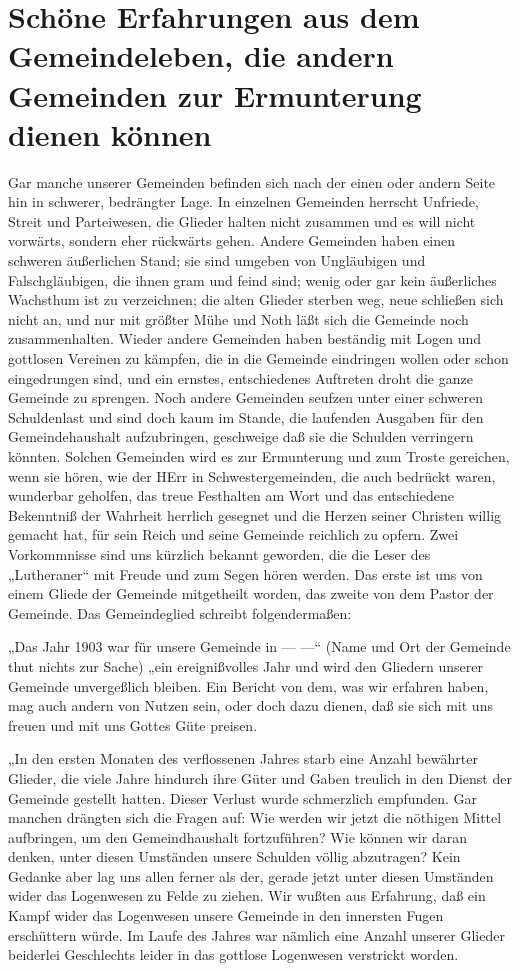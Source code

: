 \chapter[Schöne Erfahrungen aus dem Gemeindeleben]{Schöne Erfahrungen aus dem Gemeindeleben, die andern Gemeinden zur Ermunterung dienen können}

Gar manche unserer Gemeinden befinden sich nach der einen oder andern Seite hin in schwerer, bedrängter Lage. In einzelnen Gemeinden herrscht Unfriede, Streit und Parteiwesen, die Glieder halten nicht zusammen und es will nicht vorwärts, sondern eher rückwärts gehen. Andere Gemeinden haben einen schweren äußerlichen Stand; sie sind umgeben von Ungläubigen und Falschgläubigen, die ihnen gram und feind sind; wenig oder gar kein äußerliches Wachsthum ist zu verzeichnen; die alten Glieder sterben weg, neue schließen sich nicht an, und nur mit größter Mühe und Noth läßt sich die Gemeinde noch zusammenhalten. Wieder andere Gemeinden haben beständig mit Logen und gottlosen Vereinen zu kämpfen, die in die Gemeinde eindringen wollen oder schon eingedrungen sind, und ein ernstes, entschiedenes Auftreten droht die ganze Gemeinde zu sprengen. Noch andere Gemeinden seufzen unter einer schweren Schuldenlast und sind doch kaum im Stande, die laufenden Ausgaben für den Gemeindehaushalt aufzubringen, geschweige daß sie die Schulden verringern könnten. Solchen Gemeinden wird es zur Ermunterung und zum Troste gereichen, wenn sie hören, wie der HErr in Schwestergemeinden, die auch bedrückt waren, wunderbar geholfen, das treue Festhalten am Wort und das entschiedene Bekenntniß der Wahrheit herrlich gesegnet und die Herzen seiner Christen willig gemacht hat, für sein Reich und seine Gemeinde reichlich zu opfern. Zwei Vorkommnisse sind uns kürzlich bekannt geworden, die die Leser des „Lutheraner“ mit Freude und zum Segen hören werden. Das erste ist uns von einem Gliede der Gemeinde mitgetheilt worden, das zweite von dem Pastor der Gemeinde. Das Gemeindeglied schreibt folgendermaßen:

„Das Jahr 1903 war für unsere Gemeinde in — —“ (Name und Ort der Gemeinde thut nichts zur Sache) „ein ereignißvolles
Jahr und wird den Gliedern unserer Gemeinde unvergeßlich bleiben. Ein Bericht von dem, was wir erfahren haben, mag auch andern von Nutzen sein, oder doch dazu dienen, daß sie sich mit uns freuen und mit uns Gottes Güte preisen.

„In den ersten Monaten des verflossenen Jahres starb eine Anzahl bewährter Glieder, die viele Jahre hindurch ihre Güter und Gaben treulich in den Dienst der Gemeinde gestellt hatten. Dieser Verlust wurde schmerzlich empfunden. Gar manchen drängten sich die Fragen auf: Wie werden wir jetzt die nöthigen Mittel aufbringen, um den Gemeindhaushalt fortzuführen? Wie können wir daran denken, unter diesen Umständen unsere Schulden völlig abzutragen? Kein Gedanke aber lag uns allen ferner als der, gerade jetzt unter diesen Umständen wider das Logenwesen zu Felde zu ziehen. Wir wußten aus Erfahrung, daß ein Kampf wider das Logenwesen unsere Gemeinde in den innersten Fugen erschüttern würde. Im Laufe des Jahres war nämlich eine Anzahl unserer Glieder beiderlei Geschlechts leider in das gottlose Logenwesen verstrickt worden.

